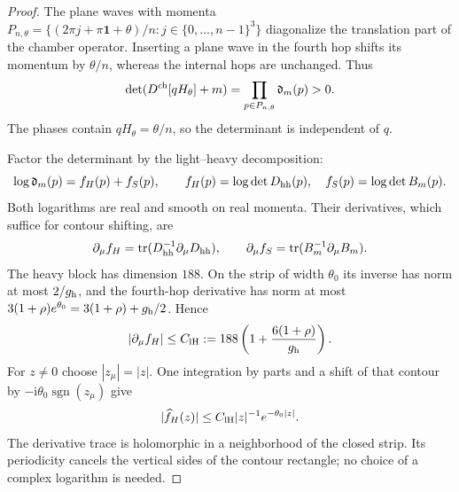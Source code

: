 \documentclass[11pt,letterpaper,reqno]{amsart}
\DeclareMathOperator{\tr}{tr}
\begin{document}
\begin{proof}
The plane waves with momenta
$P_{n,\theta}=\{(2\pi j+\pi\mathbf1+\theta)/n:
j\in\{0,\ldots,n-1\}^3\}$ diagonalize the translation
part of the chamber operator. Inserting a plane wave
in the fourth hop shifts its momentum by $\theta/n$,
whereas the internal hops are unchanged. Thus
\begin{equation}\label{eq:term-free-product}
 \det(D^{\rm ch}[qH_\theta]+m)
                   =\prod_{p\in P_{n,\theta}}\mathfrak d_m(p)>0.
\end{equation}
The phases contain $qH_\theta=\theta/n$, so the determinant
is independent of $q$.

Factor the determinant by the light--heavy decomposition:
\[
 \log\mathfrak d_m(p)=f_H(p)+f_S(p),\qquad
 f_H(p)=\log\det D_{\rm hh}(p),\quad
 f_S(p)=\log\det B_m(p).
\]
Both logarithms are real and smooth on real momenta.
Their derivatives, which suffice for contour shifting, are
\[
 \partial_\mu f_H=\tr(D_{\rm hh}^{-1}\partial_\mu D_{\rm hh}),
 \qquad
 \partial_\mu f_S=\tr(B_m^{-1}\partial_\mu B_m).
\]
The heavy block has dimension $188$. On the strip of
width $\theta_0$ its inverse has norm at most $2/g_{\rm h}$,
and the fourth-hop derivative has norm at most
$3(1+\rho)e^{\theta_0}=3(1+\rho)+g_{\rm h}/2$.
Hence
\[
 |\partial_\mu f_H|\le
 C_{\rm lH}:=188\left(1+\frac{6(1+\rho)}{g_{\rm h}}\right).
\]
For $z\ne0$ choose $|z_\mu|=|z|$. One integration by parts
and a shift of that contour by
$-\mathrm i\theta_0\operatorname{sgn}(z_\mu)$ give
\begin{equation}\label{eq:term-heavy-log-Fourier}
 |\widehat f_H(z)|\le C_{\rm lH}|z|^{-1}e^{-\theta_0|z|}.
\end{equation}
The derivative trace is holomorphic in a neighborhood of
the closed strip. Its periodicity cancels the vertical sides
of the contour rectangle; no choice of a complex logarithm
is needed.


\end{proof}
\end{document}
